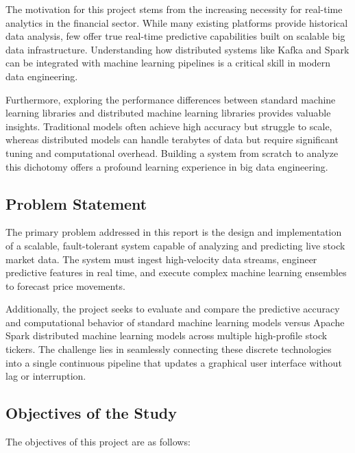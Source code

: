 \documentclass[12pt,a4paper]{report}
\begin{document}
The motivation for this project stems from the increasing necessity for real-time analytics in the financial sector. While many existing platforms provide historical data analysis, few offer true real-time predictive capabilities built on scalable big data infrastructure. Understanding how distributed systems like Kafka and Spark can be integrated with machine learning pipelines is a critical skill in modern data engineering.

Furthermore, exploring the performance differences between standard machine learning libraries and distributed machine learning libraries provides valuable insights. Traditional models often achieve high accuracy but struggle to scale, whereas distributed models can handle terabytes of data but require significant tuning and computational overhead. Building a system from scratch to analyze this dichotomy offers a profound learning experience in big data engineering.

\subsection{Problem Statement}

The primary problem addressed in this report is the design and implementation of a scalable, fault-tolerant system capable of analyzing and predicting live stock market data. The system must ingest high-velocity data streams, engineer predictive features in real time, and execute complex machine learning ensembles to forecast price movements.

Additionally, the project seeks to evaluate and compare the predictive accuracy and computational behavior of standard machine learning models versus Apache Spark distributed machine learning models across multiple high-profile stock tickers. The challenge lies in seamlessly connecting these discrete technologies into a single continuous pipeline that updates a graphical user interface without lag or interruption.

\subsection{Objectives of the Study}

The objectives of this project are as follows:
\end{document}
